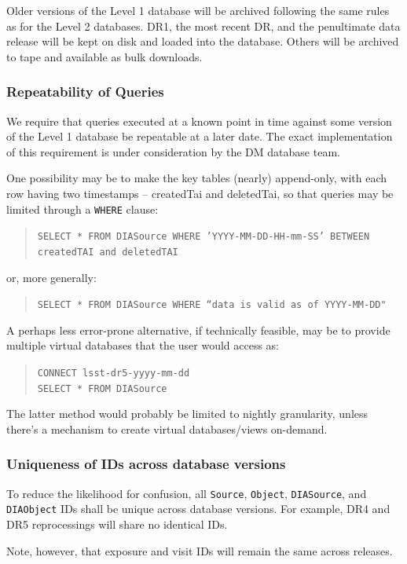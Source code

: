 \documentclass[12pt]{article}
\newcommand{\code}[1]{\texttt{#1}}
\newcommand{\DIASource}{\code{DIASource}\xspace}
\newcommand{\DIAObject}{\code{DIAObject}\xspace}
\newcommand{\DB}{{Level 1 database}\xspace}
\newcommand{\DR}{{Level 2 database}\xspace}
\newcommand{\Object}{\code{Object}\xspace}
\newcommand{\Source}{\code{Source}\xspace}
\begin{document}
Older versions of the \DB will be archived following the same rules as for the \DR{}s. DR1, the most recent DR, and the penultimate data release will be kept on disk and loaded into the database. Others will be archived to tape and available as bulk downloads.

\subsubsection{Repeatability of Queries}

We require that queries executed at a known point in time against some version of the \DB be repeatable at a later date. The exact implementation of this requirement is under consideration by the DM database team.

One possibility may be to make the key tables (nearly) append-only, with each row having two timestamps -- createdTai and deletedTai, so that queries may be limited through a \code{WHERE} clause:
%
\begin{quote}
\texttt{SELECT * FROM DIASource WHERE 'YYYY-MM-DD-HH-mm-SS' BETWEEN createdTAI and deletedTAI}
\end{quote}
%
or, more generally:
%
\begin{quote}
\code{SELECT * FROM DIASource WHERE ``data is valid as of YYYY-MM-DD"}
\end{quote}

A perhaps less error-prone alternative, if technically feasible, may be to provide multiple virtual databases that the user would access as:
%
\begin{quote}
\texttt{CONNECT lsst-dr5-yyyy-mm-dd} \\
\texttt{SELECT * FROM DIASource}
\end{quote}
%
The latter method would probably be limited to nightly granularity, unless there's a mechanism to create virtual databases/views on-demand.

\subsubsection{Uniqueness of IDs across database versions}

To reduce the likelihood for confusion, all \Source, \Object, \DIASource, and \DIAObject IDs shall be unique across database versions. For example, DR4 and DR5 reprocessings will share no identical IDs. 

Note, however, that exposure and visit IDs will remain the same across releases.
\end{document}
